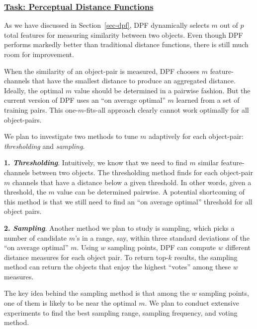 \subsubsection*{\underline{Task: Perceptual Distance Functions}}

As we have discussed in Section~\ref{sec-dpf}, DPF dynamically
selects $m$ out of $p$ total features for measuring
similarity between two objects.
Even though DPF performs markedly better than traditional
distance functions, there is still much room for improvement.  

When the similarity of an object-pair is measured, DPF 
chooses $m$ feature-channels that have the smallest distance
to produce an aggregated distance.   Ideally, the optimal $m$ value should
be determined in a pairwise fashion.  But the current version 
of DPF uses an ``on average optimal'' $m$ learned from
a set of training pairs.  This one-$m$-fits-all approach
clearly cannot work optimally for all object-pairs.

We plan to investigate two methods to tune $m$ adaptively for each 
object-pair: {\em thresholding} and {\em sampling}.
\begin{nlist}
\item {\bf 1. \em Thresholding}.
 Intuitively, we know that we need to find $m$ similar feature-channels 
 between two objects.  The thresholding method finds for
 each object-pair $m$ channels that have a distance 
 below a given threshold.  In other words, given a threshold,
 the $m$ value can be determined pairwise.
 A potential shortcoming of this method is that
 we still need to find an ``on average
 optimal'' threshold for all object pairs.  
 
\item {\bf 2. \em Sampling}.
 Another method we plan to study is sampling,
 which picks a number of candidate $m$'s
 in a range, say, within three standard deviations of the
 ``on average optimal'' $m$. Using $w$ sampling points, DPF
 can compute $w$ different distance measures for each object pair.
 To return top-$k$ results, the sampling method can return 
 the objects that enjoy the highest ``votes'' among these $w$ 
 measures.

 The key idea behind the sampling method is that 
 among the $w$ sampling points, one of them is 
 likely to be near the optimal $m$.  We plan to
 conduct extensive experiments to find the best
 sampling range, sampling frequency, and voting method.
\end{nlist}

